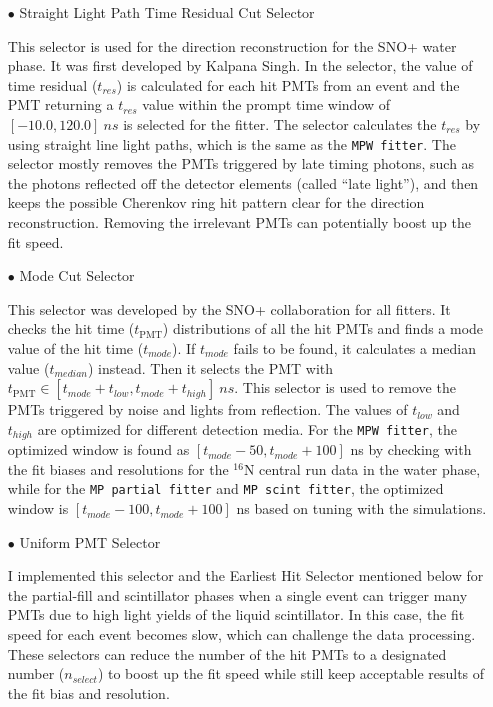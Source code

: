 \begin{itemize}
	\item[$\bullet$] Straight Light Path Time Residual Cut Selector
	
	This selector is used for the direction reconstruction for the SNO+ water phase. It was first developed by Kalpana Singh\cite{kalpanaMPFitter}. In the selector, the value of time residual ($t_{res}$) is calculated for each hit PMTs from an event and the PMT returning a $t_{res}$ value within the prompt time window of $[-10.0, 120.0]~ns$ is selected for the fitter. The selector calculates the $t_{res}$ by using straight line light paths, which is the same as the \texttt{MPW fitter}. The selector mostly removes the PMTs triggered by late timing photons, such as the photons reflected off the detector elements (called ``late light''), and then keeps the possible Cherenkov ring hit pattern clear for the direction reconstruction. Removing the irrelevant PMTs can potentially boost up the fit speed.
	
	\item[$\bullet$] Mode Cut Selector
	
	This selector was developed by the SNO+ collaboration for all fitters. It checks the hit time ($t_\mathrm{PMT}$) distributions of all the hit PMTs and finds a mode value of the hit time ($t_{mode}$). If $t_{mode}$ fails to be found, it calculates a median value ($t_{median}$) instead\cite{modeCut}. Then it selects the PMT with $t_\mathrm{PMT} \in [t_{mode}+t_{low}, t_{mode}+t_{high}]~ns$. This selector is used to remove the PMTs triggered by noise and lights from reflection. The values of $t_{low}$ and $t_{high}$ are optimized for different detection media. For the \texttt{MPW fitter}, the optimized window is found as $[t_{mode}-50, t_{mode}+100]$ ns by checking with the fit biases and resolutions for the $^{16}$N central run data in the water phase, while for the \texttt{MP partial fitter} and \texttt{MP scint fitter}, the optimized window is $[t_{mode}-100, t_{mode}+100]$ ns based on tuning with the simulations.
	
	\item[$\bullet$] Uniform PMT Selector
	
	I implemented this selector and the Earliest Hit Selector mentioned below for the partial-fill and scintillator phases when a single event can trigger many PMTs due to high light yields of the liquid scintillator. In this case, the fit speed for each event becomes slow, which can challenge the data processing. These selectors can reduce the number of the hit PMTs to a designated number ($n_{select}$) to boost up the fit speed while still keep acceptable results of the fit bias and resolution. 
	

\end{itemize}
